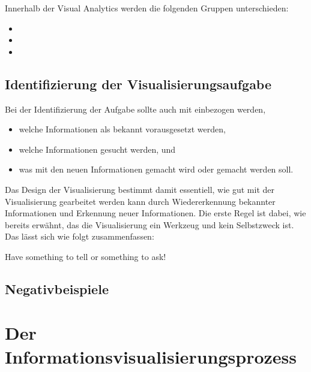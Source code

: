 		Innerhalb der Visual Analytics werden die folgenden Gruppen unterschieden:
		\begin{itemize}
			\item {}
			\item {}
			\item {}
		\end{itemize}

	\section{Identifizierung der Visualisierungsaufgabe}
		Bei der Identifizierung der Aufgabe sollte auch mit einbezogen werden,
		\begin{itemize}
			\item welche Informationen als bekannt vorausgesetzt werden,
			\item welche Informationen gesucht werden, und
			\item was mit den neuen Informationen gemacht wird oder gemacht werden soll.
		\end{itemize}
		Das Design der Visualisierung bestimmt damit essentiell, wie gut mit der Visualisierung gearbeitet werden kann durch Wiedererkennung bekannter Informationen und Erkennung neuer Informationen. Die erste Regel ist dabei, wie bereits erwähnt, das die Visualisierung ein Werkzeug und kein Selbstzweck ist. Das lässt sich wie folgt zusammenfassen:
		\begin{center}
			Have something to tell or something to ask!
		\end{center}

	\section{Negativbeispiele} %

\chapter{Der Informationsvisualisierungsprozess}
	\label{c:visualisierungsprozess}

